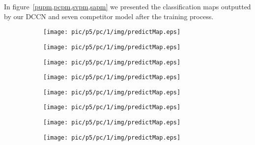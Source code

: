 \documentclass{article}
\begin{document}
	In figure~\ref{pupm,pcpm,svpm,sapm} we presented the classification maps outputted by our DCCN and seven competitor
	model after the training process.
	\begin{figure}
		\begin{subfigure}{0.12\textwidth}
			\texttt{[image: pic/p5/pc/1/img/predictMap.eps]}
			\caption{}
		\end{subfigure}
		\begin{subfigure}{0.12\textwidth}
			\texttt{[image: pic/p5/pc/1/img/predictMap.eps]}
			\caption{}
		\end{subfigure}
		\begin{subfigure}{0.12\textwidth}
			\texttt{[image: pic/p5/pc/1/img/predictMap.eps]}
			\caption{}
		\end{subfigure}
		\begin{subfigure}{0.12\textwidth}
			\texttt{[image: pic/p5/pc/1/img/predictMap.eps]}
			\caption{}
		\end{subfigure}
		\begin{subfigure}{0.12\textwidth}
			\texttt{[image: pic/p5/pc/1/img/predictMap.eps]}
			\caption{}
		\end{subfigure}
		\begin{subfigure}{0.12\textwidth}
			\texttt{[image: pic/p5/pc/1/img/predictMap.eps]}
			\caption{}
		\end{subfigure}
		\begin{subfigure}{0.12\textwidth}
			\texttt{[image: pic/p5/pc/1/img/predictMap.eps]}
			\caption{}
		\end{subfigure}
		\begin{subfigure}{0.12\textwidth}
			\texttt{[image: pic/p5/pc/1/img/predictMap.eps]}
			\caption{}
		\end{subfigure}
		\label{pcpm}
	\end{figure}
\end{document}
